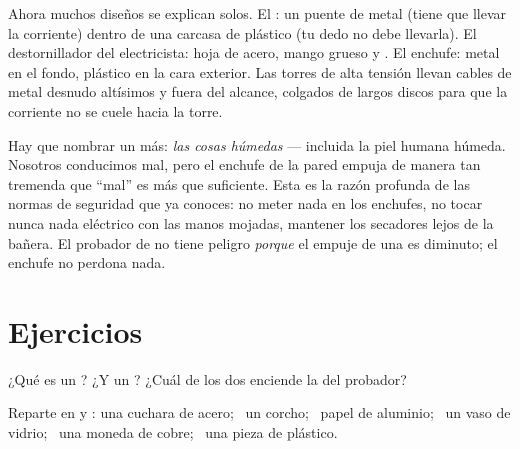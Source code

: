 \begin{example}\label{ex:g4:conductors-insulators:objects}
Ahora muchos diseños se explican solos. El : un puente de
metal (tiene que llevar la corriente) dentro de una carcasa de
plástico (tu dedo no debe llevarla). El destornillador del
electricista: hoja de acero, mango grueso y . El enchufe:
metal en el fondo, plástico en la cara exterior. Las torres de alta
tensión llevan cables de metal desnudo altísimos y fuera del alcance,
colgados de largos discos  para que la corriente no se cuele
hacia la torre.
\end{example}

\begin{remark}\label{rem:g4:conductors-insulators:safety}
Hay que nombrar un  más: \emph{las cosas húmedas} ---
incluida la piel humana húmeda. Nosotros conducimos mal, pero el
enchufe de la pared empuja de manera tan tremenda que ``mal'' es más
que suficiente. Esta es la razón profunda de las normas de seguridad
que ya conoces: no meter nada en los enchufes, no tocar nunca nada
eléctrico con las manos mojadas, mantener los secadores lejos de la
bañera. El probador de  no tiene peligro \emph{porque} el empuje
de una  es diminuto; el enchufe no perdona nada.
\end{remark}

\section{Ejercicios}

\begin{exercise}[$\star$]\label{exo:g4:conductors-insulators:1}
¿Qué es un ? ¿Y un ? ¿Cuál de los dos
enciende la  del probador?
\end{exercise}

\begin{exercise}[$\star$]\label{exo:g4:conductors-insulators:2}
Reparte en  y : una cuchara de acero; \ un
corcho; \ papel de aluminio; \ un vaso de vidrio; \ una moneda de
cobre; \ una pieza de plástico.
\end{exercise}

